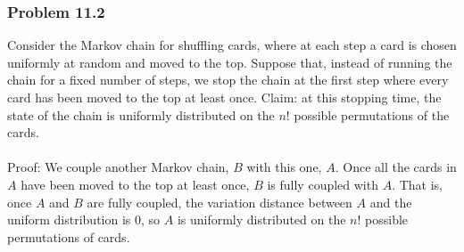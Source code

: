 \documentclass[12pt,letterpaper]{article}
\newenvironment{answer}[1]{
  \subsubsection*{Problem #1}
}{\newpage}
\begin{document}
\begin{answer}{11.2}
Consider the Markov chain for shuffling cards, where at each step a card is chosen uniformly at random and moved to the top. Suppose that, instead of running the chain for a fixed number of steps, we stop the chain at the first step where every card has been moved to the top at least once. Claim: at this stopping time, the state of the chain is uniformly distributed on the $n!$ possible permutations of the cards.\\\\
Proof: We couple another Markov chain, $B$ with this one, $A$. Once all the cards in $A$ have been moved to the top at least once, $B$ is fully coupled with $A$. That is, once $A$ and $B$ are fully coupled, the variation distance between $A$ and the uniform distribution is 0, so $A$ is uniformly distributed on the $n!$ possible permutations of cards.
\end{answer}
\end{document}

